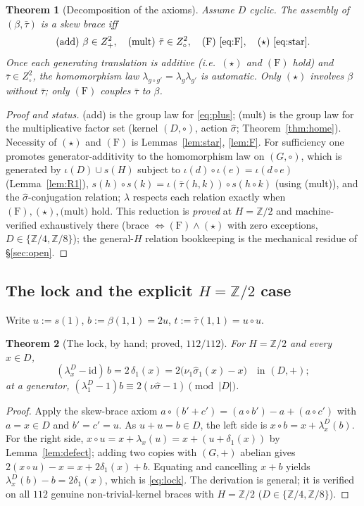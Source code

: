 \documentclass[11pt,reqno]{amsart}
\theoremstyle{plain}
\newtheorem{theorem}{Theorem}[section]
\theoremstyle{definition}
\newcommand{\Z}{\mathbb{Z}}
\newcommand{\id}{\mathrm{id}}
\newcommand{\shat}{\widehat{\sigma}}
\newcommand{\lD}{\lambda^{D}}
\newcommand{\iot}{\iota}
\begin{document}
\begin{theorem}[Decomposition of the axioms]\label{thm:decomp}
Assume $D$ cyclic. The assembly of $(\beta,\bar\tau)$ is a skew brace iff
\[
\mathrm{(add)}\ \beta\in Z^2_+,\quad
\mathrm{(mult)}\ \bar\tau\in Z^2_\circ,\quad
\mathrm{(F)}\ \eqref{eq:F},\quad
(\star)\ \eqref{eq:star}.
\]
Once each generating translation is additive (i.e.\ $(\star)$ and $\mathrm{(F)}$ hold) and
$\bar\tau\in Z^2_\circ$, the homomorphism law $\lambda_{g\circ g'}=\lambda_g\lambda_{g'}$ is
automatic. Only $(\star)$ involves $\beta$ without $\bar\tau$; only $\mathrm{(F)}$ couples
$\bar\tau$ to $\beta$.
\end{theorem}
\begin{proof}[Proof and status]
(add) is the group law for \eqref{eq:plus}; (mult) is the group law for the multiplicative
factor set (kernel $(D,\circ)$, action $\shat$; Theorem~\ref{thm:home}). Necessity of
$(\star)$ and $\mathrm{(F)}$ is Lemmas~\ref{lem:star}, \ref{lem:F}. For sufficiency one
promotes generator-additivity to the homomorphism law on $(G,\circ)$, which is generated by
$\iot(D)\cup s(H)$ subject to $\iot(d)\circ\iot(e)=\iot(d\circ e)$ (Lemma~\ref{lem:R1}),
$s(h)\circ s(k)=\iot(\bar\tau(h,k))\circ s(h\circ k)$ (using (mult)), and the
$\shat$-conjugation relation; $\lambda$ respects each relation exactly when
$\mathrm{(F)},(\star),\text{(mult)}$ hold. This reduction is \emph{proved} at $H=\Z/2$ and
machine-verified exhaustively there (brace $\Leftrightarrow\mathrm{(F)}\wedge(\star)$ with
zero exceptions, $D\in\{\Z/4,\Z/8\}$); the general-$H$ relation bookkeeping is the
mechanical residue of \S\ref{sec:open}.
\end{proof}

\subsection{The lock and the explicit $H=\Z/2$ case}\label{sec:lock}
Write $u:=s(1)$, $b:=\beta(1,1)=2u$, $t:=\bar\tau(1,1)=u\circ u$.

\begin{theorem}[The lock, by hand; proved, $112/112$]\label{thm:lock}
For $H=\Z/2$ and every $x\in D$,
\begin{equation}\label{eq:lock}
(\lD_x-\id)\,b=2\,\delta_1(x)=2\big(\nu_1\shat_1(x)-x\big)\quad\text{in }(D,+);
\end{equation}
at a generator, $(\lD_1-1)b\equiv2(\nu\shat-1)\pmod{|D|}$.
\end{theorem}
\begin{proof}
Apply the skew-brace axiom $a\circ(b'+c')=(a\circ b')-a+(a\circ c')$ with $a=x\in D$ and
$b'=c'=u$. As $u+u=b\in D$, the left side is $x\circ b=x+\lD_x(b)$. For the right side,
$x\circ u=x+\lambda_x(u)=x+(u+\delta_1(x))$ by Lemma~\ref{lem:defect}; adding two copies
with $(G,+)$ abelian gives $2(x\circ u)-x=x+2\delta_1(x)+b$. Equating and cancelling $x+b$
yields $\lD_x(b)-b=2\delta_1(x)$, which is \eqref{eq:lock}. The derivation is general; it is
verified on all $112$ genuine non-trivial-kernel braces with $H=\Z/2$ ($D\in\{\Z/4,\Z/8\}$).
\end{proof}
\end{document}
